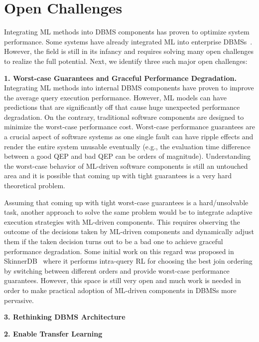 \section{Open Challenges}
Integrating ML methods into DBMS components has proven to optimize system performance.
Some systems have already integrated ML into enterprise DBMSs~\cite{leo, cardlearner, verdict}.
However, the field is still in its infancy and requires solving many open challenges to realize the full potential.
Next, we identify three such major open challenges:


\vspace{2mm}
\noindent \textbf{1. Worst-case Guarantees and Graceful Performance Degradation.} Integrating ML methods into internal DBMS components have proven to improve the average query execution performance.
However, ML models can have predictions that are significantly off that cause huge unexpected performance degradation.
On the contrary, traditional software components are designed to minimize the worst-case performance cost.
Worst-case performance guarantees are a crucial aspect of software systems as one single fault can have ripple effects and render the entire system unusable eventually (e.g., the evaluation time difference between a good QEP and bad QEP can be orders of magnitude).
Understanding the worst-case behavior of ML-driven software components is still an untouched area and it is possible that coming up with tight guarantees is a very hard theoretical problem.

Assuming that coming up with tight worst-case guarantees is a hard/unsolvable task, another approach to solve the same problem would be to integrate adaptive execution strategies with ML-driven components.
This requires observing the outcome of the decisions taken by ML-driven components and dynamically adjust them if the taken decision turns out to be a bad one to achieve graceful performance degradation.
Some initial work on this regard was proposed in SkinnerDB~\cite{skinnerdb} where it performs intra-query RL for choosing the best join ordering by switching between different orders and provide worst-case performance guarantees.
However, this space is still very open and much work is needed in order to make practical adoption of ML-driven components in DBMSs more pervasive.


\vspace{2mm}
\noindent \textbf{3. Rethinking DBMS Architecture}



\vspace{2mm}
\noindent \textbf{2. Enable Transfer Learning}
